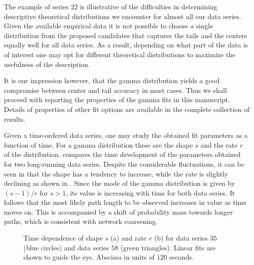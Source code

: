 		The example of series $22$ is illustrative of the difficulties in determining descriptive theoretical distributions we encounter for almost all our data series. Given the available empirical data it is not possible to choose a single distribution from the proposed candidates that captures the tails and the centers equally well for all data series. As a result, depending on what part of the data is of interest one may opt for different theoretical distributions to maximize the usefulness of the description.

		It is our impression however, that the gamma distribution yields a good compromise between center and tail accuracy in most cases. Thus we shall proceed with reporting the properties of the gamma fits in this manuscript. Details of properties of other fit options are available in the complete collection of results. 

		Given a time-ordered data series, one may study the obtained fit parameters as a function of time. For a gamma distribution these are the shape $s$ and the rate $r$ of the distribution.  compares the time development of the parameters obtained for two long-running data series. Despite the considerable fluctuations, it can be seen in  that the shape has a tendency to increase, while the rate is slightly declining as shown in . Since the mode of the gamma distribution is given by $(s-1)/r$ for $s > 1$, its value is increasing with time for both data series. It follows that the most likely path length to be observed increases in value as time moves on. This is accompanied by a shift of probability mass towards longer paths, which is consistent with network coarsening. 

		\begin{figure}
			\centering

			\caption[Path length distribution fit parameters.]{Time dependence of shape $s$ (a) and rate $r$ (b) for data series $35$ (blue circles) and data series $58$ (green triangles). Linear fits are shown to guide the eye. Abscissa in units of $120$ seconds.}
			\label{fig:path_lengths_fit_parameters}
		\end{figure}

